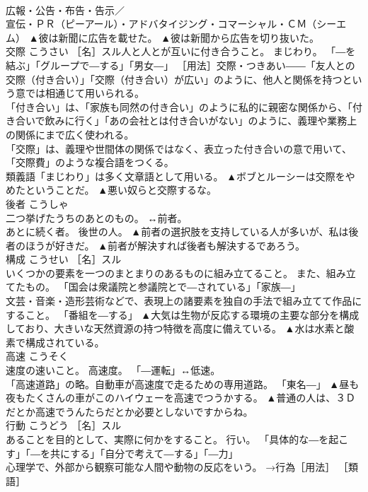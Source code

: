 \documentclass[8pt]{extreport}
\begin{document}
\begin{CJK}{UTF8}{min}
\\	広報・公告・布告・告示／
\\	宣伝・ＰＲ（ピーアール）・アドバタイジング・コマーシャル・ＣＭ（シーエム）	▲彼は新聞に広告を載せた。 ▲彼は新聞から広告を切り抜いた。
\\	交際	こうさい	［名］スル人と人とが互いに付き合うこと。 まじわり。 「―を結ぶ」「グループで―する」「男女―」 ［用法］交際・つきあい――「友人との交際（付き合い）」「交際（付き合い）が広い」のように、他人と関係を持つという意では相通じて用いられる。 
\\	「付き合い」は、「家族も同然の付き合い」のように私的に親密な関係から、「付き合いで飲みに行く」「あの会社とは付き合いがない」のように、義理や業務上の関係にまで広く使われる。 
\\	「交際」は、義理や世間体の関係ではなく、表立った付き合いの意で用いて、「交際費」のような複合語をつくる。 
\\	類義語「まじわり」は多く文章語として用いる。	▲ボブとルーシーは交際をやめたということだ。 ▲悪い奴らと交際するな。
\\	後者	こうしゃ	
\\	二つ挙げたうちのあとのもの。 ↔前者。 
\\	あとに続く者。 後世の人。	▲前者の選択肢を支持している人が多いが、私は後者のほうが好きだ。 ▲前者が解決すれば後者も解決するであろう。
\\	構成	こうせい	［名］スル 
\\	いくつかの要素を一つのまとまりのあるものに組み立てること。 また、組み立てたもの。 「国会は衆議院と参議院とで―されている」「家族―」 
\\	文芸・音楽・造形芸術などで、表現上の諸要素を独自の手法で組み立てて作品にすること。 「番組を―する」	▲大気は生物が反応する環境の主要な部分を構成しており、大きいな天然資源の持つ特徴を高度に備えている。 ▲水は水素と酸素で構成されている。
\\	高速	こうそく	
\\	速度の速いこと。 高速度。 「―運転」↔低速。 
\\	「高速道路」の略。自動車が高速度で走るための専用道路。 「東名―」	▲昼も夜もたくさんの車がこのハイウェーを高速でつうかする。 ▲普通の人は、３Ｄだとか高速でうんたらだとか必要としないですからね。
\\	行動	こうどう	［名］スル 
\\	あることを目的として、実際に何かをすること。 行い。 「具体的な―を起こす」「―を共にする」「自分で考えて―する」「―力」 
\\	心理学で、外部から観察可能な人間や動物の反応をいう。 →行為［用法］ ［類語］

\end{CJK}
\end{document}
